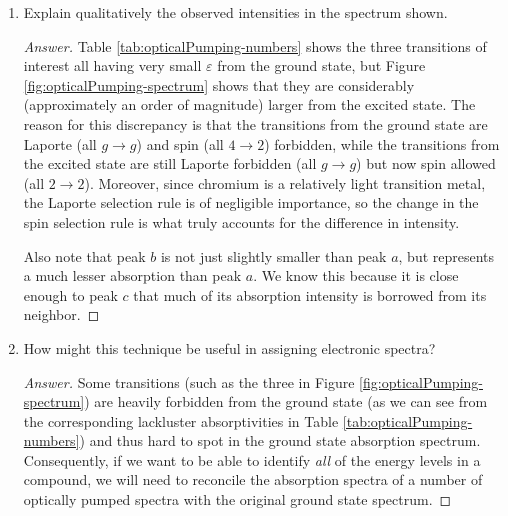 \documentclass[../psets.tex]{subfiles}
\begin{document}
\begin{enumerate}[label={\Roman*)}]
\begin{enumerate}
\begin{proof}[Answer]
            With this understanding, we are now ready to interpret Figure \ref{fig:opticalPumping-spectrum}. Peak $a$ corresponds to an energy level approximately $\SI{18600}{\per\centi\meter}$ above the ${}^2E_g$ excited state. From the original reference frame, this means that peak $a$ corresponds to an energy level approximately $\SI{18600}{\per\centi\meter}+\SI{13000}{\per\centi\meter}=\SI{31600}{\per\centi\meter}$ above the ${}^4A_{2g}$ ground state. It follows from Table \ref{tab:opticalPumping-numbers} that the energy level being accessed by this transition is ${}^2A_{1g}$. Therefore, the assignment of this transition is ${}^2E_g\to{}^2A_{1g}$. The argument is symmetric for the other two peaks, so we know that peak $b$'s assigned transitions are ${}^2E_g\to{}^2T_{1g}$ and ${}^2E_g\to{}^2T_{2g}$, and peak $c$'s assigned transition is ${}^2E_g\to{}^2E_g$.
        \end{proof}
        \item Explain qualitatively the observed intensities in the spectrum shown.
        \begin{proof}[Answer]
            Table \ref{tab:opticalPumping-numbers} shows the three transitions of interest all having very small $\varepsilon$ from the ground state, but Figure \ref{fig:opticalPumping-spectrum} shows that they are considerably (approximately an order of magnitude) larger from the excited state. The reason for this discrepancy is that the transitions from the ground state are Laporte (all $g\to g$) and spin (all $4\to 2$) forbidden, while the transitions from the excited state are still Laporte forbidden (all $g\to g$) but now spin allowed (all $2\to 2$). Moreover, since chromium is a relatively light transition metal, the Laporte selection rule is of negligible importance, so the change in the spin selection rule is what truly accounts for the difference in intensity.\par
            Also note that peak $b$ is not just slightly smaller than peak $a$, but represents a much lesser absorption than peak $a$. We know this because it is close enough to peak $c$ that much of its absorption intensity is borrowed from its neighbor.
        \end{proof}
        \item How might this technique be useful in assigning electronic spectra?
        \begin{proof}[Answer]
            Some transitions (such as the three in Figure \ref{fig:opticalPumping-spectrum}) are heavily forbidden from the ground state (as we can see from the corresponding lackluster absorptivities in Table \ref{tab:opticalPumping-numbers}) and thus hard to spot in the ground state absorption spectrum. Consequently, if we want to be able to identify \emph{all} of the energy levels in a compound, we will need to reconcile the absorption spectra of a number of optically pumped spectra with the original ground state spectrum.

\end{proof}
\end{enumerate}
\end{enumerate}
\end{document}
